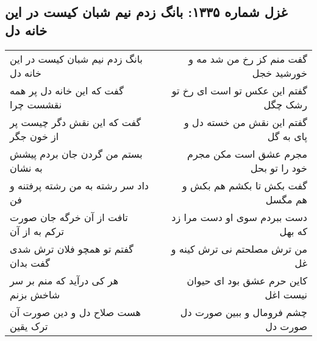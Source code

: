 \begin{center}
\section*{غزل شماره ۱۳۳۵: بانگ زدم نیم شبان کیست در این خانه دل}
\label{sec:1335}
\begin{longtable}{l p{0.5cm} r}
بانگ زدم نیم شبان کیست در این خانه دل
&&
گفت منم کز رخ من شد مه و خورشید خجل
\\
گفت که این خانه دل پر همه نقشست چرا
&&
گفتم این عکس تو است ای رخ تو رشک چگل
\\
گفت که این نقش دگر چیست پر از خون جگر
&&
گفتم این نقش من خسته دل و پای به گل
\\
بستم من گردن جان بردم پیشش به نشان
&&
مجرم عشق است مکن مجرم خود را تو بحل
\\
داد سر رشته به من رشته پرفتنه و فن
&&
گفت بکش تا بکشم هم بکش و هم مگسل
\\
تافت از آن خرگه جان صورت ترکم به از آن
&&
دست ببردم سوی او دست مرا زد که بهل
\\
گفتم تو همچو فلان ترش شدی گفت بدان
&&
من ترش مصلحتم نی ترش کینه و غل
\\
هر کی درآید که منم بر سر شاخش بزنم
&&
کاین حرم عشق بود ای حیوان نیست اغل
\\
هست صلاح دل و دین صورت آن ترک یقین
&&
چشم فرومال و ببین صورت دل صورت دل
\\
\end{longtable}
\end{center}
